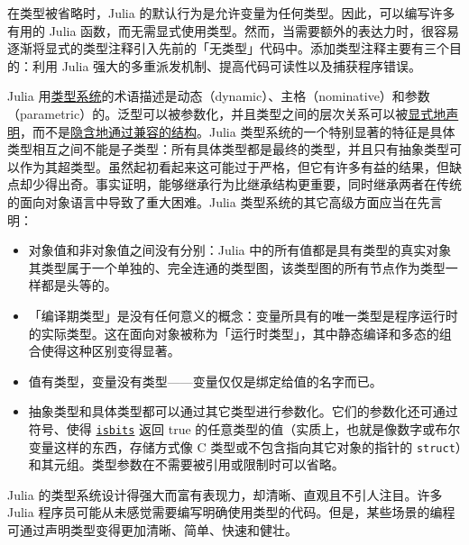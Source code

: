 在类型被省略时，Julia 的默认行为是允许变量为任何类型。因此，可以编写许多有用的 Julia 函数，而无需显式使用类型。然而，当需要额外的表达力时，很容易逐渐将显式的类型注释引入先前的「无类型」代码中。添加类型注释主要有三个目的：利用 Julia 强大的多重派发机制、提高代码可读性以及捕获程序错误。



Julia 用\href{https://en.wikipedia.org/wiki/Type\_system}{类型系统}的术语描述是动态（dynamic）、主格（nominative）和参数（parametric）的。泛型可以被参数化，并且类型之间的层次关系可以被\href{https://en.wikipedia.org/wiki/Nominal\_type\_system}{显式地声明}，而不是\href{https://en.wikipedia.org/wiki/Structural\_type\_system}{隐含地通过兼容的结构}。Julia 类型系统的一个特别显著的特征是具体类型相互之间不能是子类型：所有具体类型都是最终的类型，并且只有抽象类型可以作为其超类型。虽然起初看起来这可能过于严格，但它有许多有益的结果，但缺点却少得出奇。事实证明，能够继承行为比继承结构更重要，同时继承两者在传统的面向对象语言中导致了重大困难。Julia 类型系统的其它高级方面应当在先言明：



\begin{itemize}
\item 对象值和非对象值之间没有分别：Julia 中的所有值都是具有类型的真实对象其类型属于一个单独的、完全连通的类型图，该类型图的所有节点作为类型一样都是头等的。


\item 「编译期类型」是没有任何意义的概念：变量所具有的唯一类型是程序运行时的实际类型。这在面向对象被称为「运行时类型」，其中静态编译和多态的组合使得这种区别变得显著。


\item 值有类型，变量没有类型——变量仅仅是绑定给值的名字而已。


\item 抽象类型和具体类型都可以通过其它类型进行参数化。它们的参数化还可通过符号、使得 \hyperlink{12980593021531333073}{\texttt{isbits}} 返回 true 的任意类型的值（实质上，也就是像数字或布尔变量这样的东西，存储方式像 C 类型或不包含指向其它对象的指针的 \texttt{struct}）和其元组。类型参数在不需要被引用或限制时可以省略。

\end{itemize}


Julia 的类型系统设计得强大而富有表现力，却清晰、直观且不引人注目。许多 Julia 程序员可能从未感觉需要编写明确使用类型的代码。但是，某些场景的编程可通过声明类型变得更加清晰、简单、快速和健壮。



\hypertarget{11271598028486730305}{}


